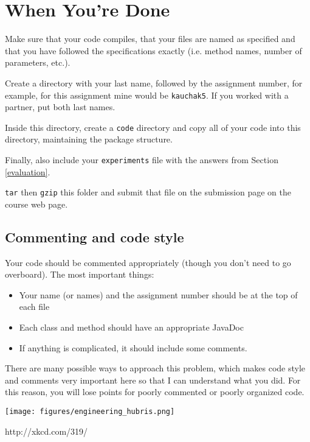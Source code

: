 \documentclass[11pt]{article}
\begin{document}
\section{When You're Done}

Make sure that your code compiles, that your files are named as specified and that you have followed the specifications exactly (i.e. method names, number of parameters, etc.).

Create a directory with your last name, followed by the assignment number, for example, for this assignment mine would be \texttt{kauchak5}.  If you worked with a partner, put both last names.

Inside this directory, create a \texttt{code} directory and copy all of your code into this directory, maintaining the package structure.

Finally, also include your \texttt{experiments} file with the answers from Section \ref{evaluation}.

\texttt{tar} then \texttt{gzip} this folder and submit that file on the submission page on the course web page.

\subsection*{Commenting and code style}

Your code should be commented appropriately (though you don't need to go overboard).    The most important things:

\begin{itemize}
\item Your name (or names) and the assignment number should be at the top of each file
\item Each class and method should have an appropriate JavaDoc
\item If anything is complicated, it should include some comments.
\end{itemize}

There are many possible ways to approach this problem, which makes code style and comments very important here so that I can understand what you did.  For this reason, you will lose points for poorly commented or poorly organized code.

\begin{center}
\texttt{[image: figures/engineering\_hubris.png]}

{\footnotesize http://xkcd.com/319/}
\end{center}
\end{document}
